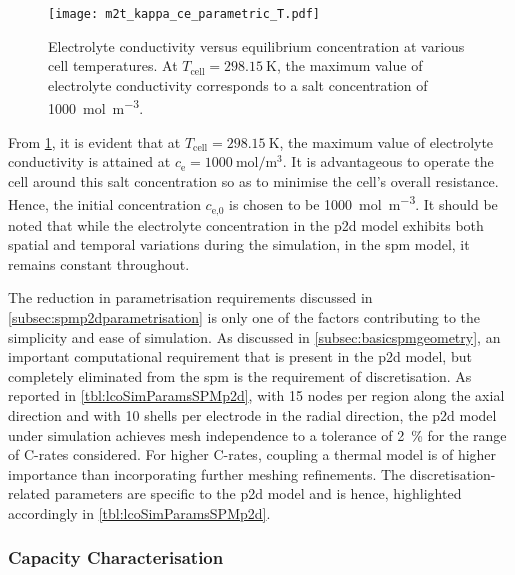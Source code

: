 \begin{figure}[!htbp]
    \centering
    \texttt{[image: m2t\_kappa\_ce\_parametric\_T.pdf]}
    \caption[Electrolyte conductivity versus concentration at various cell
    temperatures]{Electrolyte conductivity versus equilibrium concentration at
        various cell temperatures. At ${T_\text{cell} = \SI{298.15}{\kelvin}}$,
        the maximum value of electrolyte conductivity corresponds to a salt
    concentration of \SI{1000}{\mol\per\meter\cubed}.}
    \label{fig:kappavsce}
\end{figure}

From \cref{fig:kappavsce},       it        is       evident        that       at
$T_\text{cell}=\SI{298.15}{\kelvin}$,   the   maximum   value   of   electrolyte
conductivity is attained at  $c_\text{e} = \SI{1000}{\mole\per\meter\cubed}$. It
is advantageous  to operate  the cell  around this salt  concentration so  as to
minimise  the  cell's  overall  resistance.  Hence,  the  initial  concentration
$c_\text{e,0}$ is  chosen to  be \SI{1000}{\mole\per\meter\cubed}. It  should be
noted that while  the electrolyte concentration in the  \gls{p2d} model exhibits
both spatial  and temporal  variations during the  simulation, in  the \gls{spm}
model, it remains constant throughout.

The      reduction      in      parametrisation      requirements      discussed
in \cref{subsec:spmp2dparametrisation}    is   only    one   of    the   factors
contributing  to   the  simplicity   and  ease   of  simulation.   As  discussed
in \cref{subsec:basicspmgeometry},   an   important  computational   requirement
that   is  present   in   the  \gls{p2d}   model,   but  completely   eliminated
from  the   \gls{spm}  is  the   requirement  of  discretisation.   As  reported
in \cref{tbl:lcoSimParamsSPMp2d},  with  15 nodes  per  region  along the  axial
direction  and  with 10  shells  per  electrode  in  the radial  direction,  the
\gls{p2d}  model under  simulation  achieves mesh  independence  to a  tolerance
of  \approx\SI{2}{\percent} for  the  range of  C-rates  considered. For  higher
C-rates, coupling  a thermal  model is of  higher importance  than incorporating
further   meshing  refinements.   The   discretisation-related  parameters   are
specific  to  the   \gls{p2d}  model  and  is   hence,  highlighted  accordingly
in \cref{tbl:lcoSimParamsSPMp2d}.

\subsubsection*{Capacity Characterisation}\label{subsubsec:capcharspmp2d}

